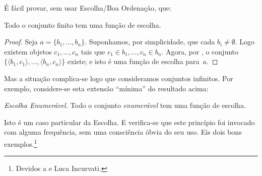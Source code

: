 \documentclass[../../../include/open-logic-section]{subfiles}
\begin{document}

É fácil provar, sem usar Escolha/Boa Ordenação, que:

\begin{lem}[em $\Zminus$]
Todo o conjunto finito tem uma função de escolha. 
\end{lem}

\begin{proof}
Seja $a = \{b_1, \ldots, b_n\}$. Suponhamos, por simplicidade, que cada $b_i
\neq \emptyset$. Logo existem objetos $c_1, \ldots, c_n$ tais que
$c_1 \in b_1, \ldots, c_n \in b_n$. Agora, por
, o conjunto $\{\langle b_1,
c_1\rangle , \ldots, \langle b_n, c_n\rangle\}$ existe; e isto é uma
função de escolha para~$a$.
\end{proof}

Mas a situação complica-se logo que consideramos conjuntos infinitos. Por
exemplo, considere-se esta extensão ``mínima'' do resultado acima:

\begin{defish}
\emph{Escolha Enumerável.} Todo o conjunto \emph{enumerável} tem uma função de escolha. 
\end{defish}

Isto é um caso particular da Escolha. E verifica-se que este
princípio foi invocado com alguma frequência, sem uma consciência óbvia
do seu uso. Eis dois bons exemplos.\footnote{Devidos a
\protect\citet[\S9.4]{Potter2004} e Luca Incurvati.}
\end{document}
